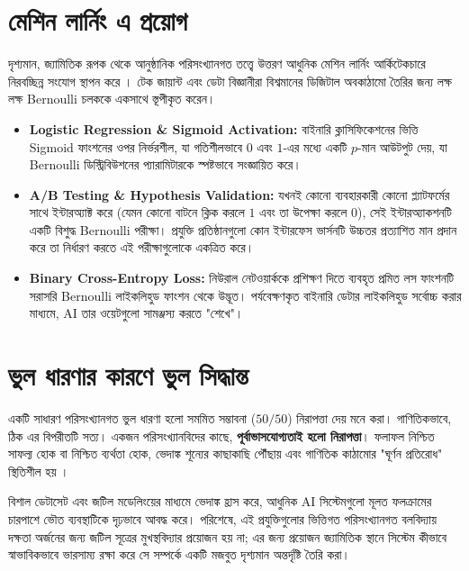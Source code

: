 \documentclass[12pt]{article}
\newcommand{\purplehighlight}[1]{\textcolor{purplehl}{\textbf{#1}}}
\begin{document}
\section*{মেশিন লার্নিং এ প্রয়োগ}
দৃশ্যমান, জ্যামিতিক রূপক থেকে আনুষ্ঠানিক পরিসংখ্যানগত তত্ত্বে উত্তরণ আধুনিক মেশিন লার্নিং আর্কিটেকচারে নিরবচ্ছিন্ন সংযোগ স্থাপন করে \cite{goodfellow2016}। টেক জায়ান্ট এবং ডেটা বিজ্ঞানীরা বিশ্বমানের ডিজিটাল অবকাঠামো তৈরির জন্য লক্ষ লক্ষ Bernoulli চলককে একসাথে স্তূপীকৃত করেন।

\begin{itemize}
    \item \purplehighlight{Logistic Regression \& Sigmoid Activation:} বাইনারি ক্লাসিফিকেশনের ভিত্তি Sigmoid ফাংশনের ওপর নির্ভরশীল, যা গতিশীলভাবে $0$ এবং $1$-এর মধ্যে একটি $p$-মান আউটপুট দেয়, যা Bernoulli ডিস্ট্রিবিউশনের প্যারামিটারকে স্পষ্টভাবে সংজ্ঞায়িত করে।
    \item \purplehighlight{A/B Testing \& Hypothesis Validation:} যখনই কোনো ব্যবহারকারী কোনো প্ল্যাটফর্মের সাথে ইন্টারঅ্যাক্ট করে (যেমন কোনো বাটনে ক্লিক করলে $1$ এবং তা উপেক্ষা করলে $0$), সেই ইন্টারঅ্যাকশনটি একটি বিশুদ্ধ Bernoulli পরীক্ষা। প্রযুক্তি প্রতিষ্ঠানগুলো কোন ইন্টারফেস ভার্সনটি উচ্চতর প্রত্যাশিত মান প্রদান করে তা নির্ধারণ করতে এই পরীক্ষাগুলোকে একত্রিত করে।
    \item \purplehighlight{Binary Cross-Entropy Loss:} নিউরাল নেটওয়ার্ককে প্রশিক্ষণ দিতে ব্যবহৃত প্রমিত লস ফাংশনটি সরাসরি Bernoulli লাইকলিহুড ফাংশন থেকে উদ্ভূত। পর্যবেক্ষণকৃত বাইনারি ডেটার লাইকলিহুড সর্বোচ্চ করার মাধ্যমে, AI তার ওয়েটগুলো সামঞ্জস্য করতে "শেখে"।
\end{itemize}

\section*{ভুল ধারণার কারণে ভুল সিদ্ধান্ত}
একটি সাধারণ পরিসংখ্যানগত ভুল ধারণা হলো সমমিত সম্ভাবনা ($50/50$) নিরাপত্তা দেয় মনে করা। গাণিতিকভাবে, ঠিক এর বিপরীতটি সত্য। একজন পরিসংখ্যানবিদের কাছে, \purplehighlight{পূর্বাভাসযোগ্যতাই হলো নিরাপত্তা}। ফলাফল নিশ্চিত সাফল্য হোক বা নিশ্চিত ব্যর্থতা হোক, ভেদাঙ্ক শূন্যের কাছাকাছি পৌঁছায় এবং গাণিতিক কাঠামোর "ঘূর্ণন প্রতিরোধ" স্থিতিশীল হয় \cite{shannon1948}।

বিশাল ডেটাসেট এবং জটিল মডেলিংয়ের মাধ্যমে ভেদাঙ্ক হ্রাস করে, আধুনিক AI সিস্টেমগুলো মূলত ফলক্রামের চারপাশে ভৌত ব্যবস্থাটিকে দৃঢ়ভাবে আবদ্ধ করে। পরিশেষে, এই প্রযুক্তিগুলোর ভিত্তিগত পরিসংখ্যানগত বলবিদ্যায় দক্ষতা অর্জনের জন্য জটিল সূত্রের মুখস্থবিদ্যার প্রয়োজন হয় না; এর জন্য প্রয়োজন জ্যামিতিক স্থানে সিস্টেম কীভাবে স্বাভাবিকভাবে ভারসাম্য রক্ষা করে সে সম্পর্কে একটি মজবুত দৃশ্যমান অন্তর্দৃষ্টি তৈরি করা।
\end{document}
